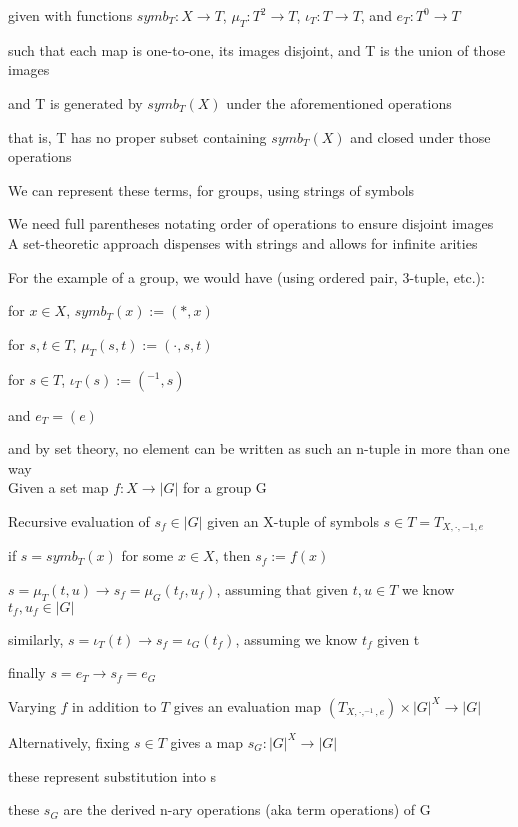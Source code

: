 \documentclass[12pt]{article}
\begin{document}
given with functions $symb_T: X \to T$, $\mu_T: T^2 \to T$, $\iota_T: T \to T$, and $e_T: T^0 \to T$

such that each map is one-to-one, its images disjoint, and T is the union of those images

and T is generated by $symb_T(X)$ under the aforementioned operations

that is, T has no proper subset containing $symb_T(X)$ and closed under those operations

\noindent
We can represent these terms, for groups, using strings of symbols

We need full parentheses notating order of operations to ensure disjoint images\\

\noindent
A set-theoretic approach dispenses with strings and allows for infinite arities

\noindent
For the example of a group, we would have (using ordered pair, 3-tuple, etc.):

for $x \in X$, $symb_T(x) := (*, x)$

for $s, t \in T$, $\mu_T(s, t) := (\cdot, s, t)$

for $s \in T$, $\iota_T(s) := (^{-1}, s)$

and $e_T = (e)$

and by set theory, no element can be written as such an n-tuple in more than one way\\

\noindent
Given a set map $f: X \to |G|$ for a group G

\noindent
Recursive evaluation of $s_f \in |G|$ given an X-tuple of symbols $s \in T = T_{X, \cdot, -1, e}$

if $s= symb_T(x)$ for some $x \in X$, then $s_f := f(x)$

$s = \mu_T(t, u) \to s_f = \mu_G(t_f, u_f)$, assuming that given $t, u \in T$ we know $t_f, u_f \in |G|$

similarly, $s = \iota_T(t) \to s_f = \iota_G(t_f)$, assuming we know $t_f$ given t

finally $s = e_T \to s_f = e_G$

\noindent
Varying $f$ in addition to $T$ gives an evaluation map $(T_{X, \cdot, ^{-1}, e}) \times |G|^X \to |G|$

\noindent
Alternatively, fixing $s \in T$ gives a map $s_G: |G|^X \to |G|$

these represent substitution into s

these $s_G$ are the derived n-ary operations (aka term operations) of G
\end{document}
